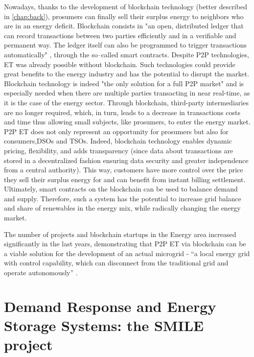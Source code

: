 Nowadays, thanks to the development of blockchain technology (better described in \cref{chap:back}), prosumers can finally sell their surplus energy to neighbors who are in an energy deficit. Blockchain consists in "an open, distributed ledger that can record transactions between two parties efficiently and in a verifiable and permanent way. The ledger itself can also be programmed to trigger transactions automatically" \cite{TruthBlockchain}, through the so--called smart contracts. Despite \ac{P2P} technologies, \ac{ET} was already possible without blockchain. Such technologies could provide great benefits to the energy industry and has the potential to disrupt the market. Blockchain technology is indeed "the only solution for a full \ac{P2P} market" \cite{Powerledger} and is especially needed when there are multiple parties transacting in near real-time, as it is the case of the energy sector. Through blockchain, third-party intermediaries are no longer required, which, in turn, leads to a decrease in transactions costs and time thus allowing small subjects, like prosumers, to enter the energy market.
\ac{P2P} \ac{ET} does not only represent an opportunity for prosumers but also for consumers,\acp{DSO} and \acp{TSO}. Indeed, blockchain technology enables dynamic pricing, flexibility, and adds transparency (since data about transactions are stored in a decentralized fashion ensuring data security and greater independence from a central authority). This way, customers have more control over the price they sell their surplus energy for and can benefit from instant billing settlement. Ultimately, smart contracts on the blockchain can be used to balance demand and supply. Therefore, such a system has the potential to increase grid balance \cite{PeerToPerrEnergyTrading} and share of renewables in the energy mix, while radically changing the energy market.



The number of projects and blockchain startups in the Energy area increased significantly in the last years, demonstrating that \ac{P2P} \ac{ET} via blockchain can be a viable solution for the development of an actual microgrid - “a local energy grid with control capability, which can disconnect from the traditional grid and operate autonomously” \cite{HowMicrogridWorks}.


\section{Demand Response and Energy Storage Systems: the SMILE project}

